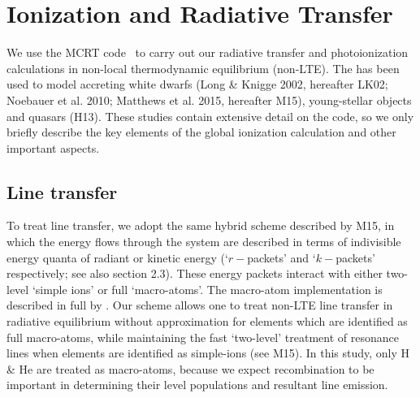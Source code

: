 \documentclass[useAMS,usenatbib]{mn2e_x}
\begin{document}










\section{Ionization and Radiative Transfer}

We use the MCRT code \py\ to carry out our radiative transfer and photoionization
calculations in non-local thermodynamic equilibrium (non-LTE). 
The has been used to model accreting white dwarfs 
(Long \& Knigge 2002, hereafter LK02; Noebauer et al. 2010; 
Matthews et al. 2015, hereafter M15), young-stellar objects \citep{simmacro2005}
and quasars (H13). \nocite{noebauer, M15, LK02}
These studies contain extensive detail on the code, 
so we only briefly describe the key elements of the global 
ionization calculation and other important aspects.

\subsection{Line transfer}

To treat line transfer, we adopt the same hybrid scheme 
described by M15, 
in which the energy flows
through the system are described in terms of indivisible
energy quanta of radiant or kinetic energy 
(`$r-$packets' and `$k-$packets' respectively; see also section 2.3).
These energy packets interact with either two-level `simple ions'
or full `macro-atoms'. The macro-atom implementation 
is described in full by \cite{lucy2002, lucy2003}.
Our scheme allows one to treat non-LTE line transfer in radiative equilibrium
without approximation for elements which are identified as 
full macro-atoms, while maintaining the fast `two-level' 
treatment of resonance lines when elements are identified 
as simple-ions (see M15). In this study,
only H \& He are treated as macro-atoms, because 
we expect recombination to be important
in determining their level populations and resultant line emission.
\end{document}
